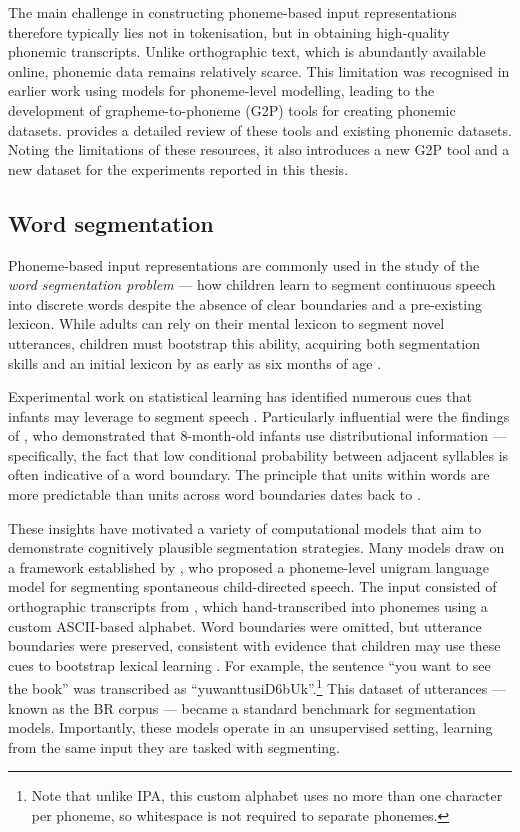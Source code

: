 The main challenge in constructing phoneme-based input representations therefore typically lies not in tokenisation, but in obtaining high-quality phonemic transcripts. Unlike orthographic text, which is abundantly available online, phonemic data remains relatively scarce. This limitation was recognised in earlier work using \ngram models for phoneme-level modelling, leading to the development of grapheme-to-phoneme (G2P) tools for creating phonemic datasets.  provides a detailed review of these tools and existing phonemic datasets. Noting the limitations of these resources, it also introduces a new G2P tool and a new dataset for the experiments reported in this thesis.

\subsection{Word segmentation}\label{sec:12-wordseg}

Phoneme-based input representations are commonly used in the study of the \emph{word segmentation problem} --- how children learn to segment continuous speech into discrete words despite the absence of clear boundaries and a pre-existing lexicon. While adults can rely on their mental lexicon to segment novel utterances, children must bootstrap this ability, acquiring both segmentation skills and an initial lexicon by as early as six months of age \citep{Jusczyk1999infants}.

Experimental work on statistical learning has identified numerous cues that infants may leverage to segment speech \citep{Cutler1987, gleitman1988learning, Jusczyk1993stress, Saffran1996distributional, Jusczyk1999allophonic, Suomi1997}. Particularly influential were the findings of \citet{Saffran1996learning}, who demonstrated that 8-month-old infants use distributional information --- specifically, the fact that low conditional probability between adjacent syllables is often indicative of a word boundary. The principle that units within words are more predictable than units across word boundaries dates back to \citet{harris1955}.

These insights have motivated a variety of computational models that aim to demonstrate cognitively plausible segmentation strategies. Many models draw on a framework established by \citet{Brent1999}, who proposed a phoneme-level unigram language model for segmenting spontaneous child-directed speech. The input consisted of orthographic transcripts from \citet{bernstein1987phonology}, which \citet{Brent1999} hand-transcribed into phonemes using a custom ASCII-based alphabet. Word boundaries were omitted, but utterance boundaries were preserved, consistent with evidence that children may use these cues to bootstrap lexical learning \citep{aslin1996models}. For example, the sentence ``you want to see the book'' was transcribed as ``yuwanttusiD6bUk''.\footnote{Note that unlike IPA, this custom alphabet uses no more than one character per phoneme, so whitespace is not required to separate phonemes.} This dataset of  utterances --- known as the BR corpus --- became a standard benchmark for segmentation models. Importantly, these models operate in an unsupervised setting, learning from the same input they are tasked with segmenting.

